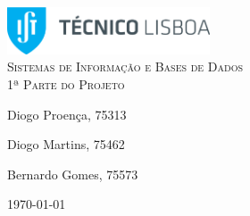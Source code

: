 \begin{titlepage}

	\begin{center}

		\includegraphics[width=6cm]{./title}\\[3cm]

		\textsc{\LARGE Sistemas de Informação e Bases de Dados}\\[1.5cm]

		\textsc{\Large 1ª Parte do Projeto}\\[1.5cm]


		


		\noindent
		\begin{minipage}{0.4\textwidth}
			\begin{flushleft} \large
				Diogo Proença, 75313
			\end{flushleft}
		\end{minipage}
		\begin{minipage}{0.4\textwidth}
			\begin{flushright} \large
				Diogo Martins, 75462
			\end{flushright}
		\end{minipage}
		
		\begin{minipage}{0.4\textwidth}
			\begin{flushright} \large
				Bernardo Gomes, 75573	
			\end{flushright}
		\end{minipage}

		\vfill

		{\large \today}


	\end{center}

\end{titlepage}